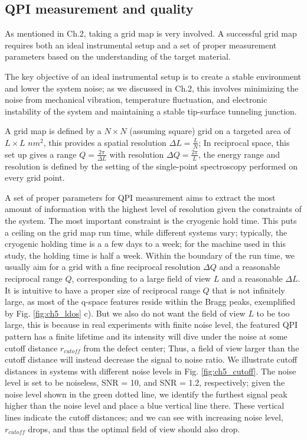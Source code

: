 \subsection{QPI measurement and quality}
As mentioned in Ch.2, taking a grid map is very involved. A successful grid map requires both an ideal instrumental setup and a set of proper measurement parameters based on the understanding of the target material. 

The key objective of an ideal instrumental setup is to create a stable environment and lower the system noise; as we discussed in Ch.2, this involves minimizing the noise from mechanical vibration, temperature fluctuation, and electronic instability of the system and maintaining a stable tip-surface tunneling junction. 

A grid map is defined by a $N\times N$ (assuming square) grid on a targeted area of $L \times L$ $nm^2$, this provides a spatial resolution $\Delta L = \frac{L}{N}$; In reciprocal space, this set up gives a range $Q = \frac{2 \pi}{\Delta L}$ with resolution $\Delta Q = \frac{2\pi}{L}$, the energy range and resolution is defined by the setting of the single-point spectroscopy performed on every grid point. 

A set of proper parameters for \ac{QPI} measurement aims to extract the most amount of information with the highest level of resolution given the constraints of the system. The most important constraint is the cryogenic hold time. This puts a ceiling on the grid map run time, while different systems vary; typically, the cryogenic holding time is a a few days to a week; for the machine used in this study, the holding time is half a week. Within the boundary of the run time, we usually aim for a grid with a fine reciprocal resolution $\Delta Q$ and a reasonable reciprocal range $Q$, corresponding to a large field of view $L$ and a reasonable $\Delta L$. It is intuitive to have a proper size of reciprocal range $Q$ that is not infinitely large, as most of the q-space features reside within the Bragg peaks, exemplified by Fig. \ref{fig:ch5_ldos} c). But we also do not want the field of view $L$ to be too large, this is because in real experiments with finite noise level, the featured \ac{QPI} pattern has a finite lifetime and its intensity will dive under the noise at some cutoff distance $r_{cutoff}$ from the defect center; Thus, a field of view larger than the cutoff distance will instead decrease the signal to noise ratio. We illustrate cutoff distances in systems with different noise levels in Fig. \ref{fig:ch5_cutoff}. The noise level is set to be noiseless, SNR = 10, and SNR = 1.2, respectively; given the noise level shown in the green dotted line, we identify the furthest signal peak higher than the noise level and place a blue vertical line there. These vertical lines indicate the cutoff distances; and we can see with increasing noise level, $r_{cutoff}$ drops, and thus the optimal field of view should also drop.  

